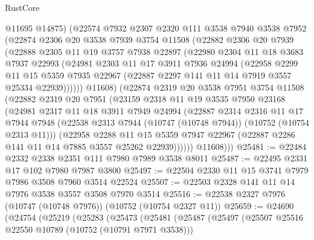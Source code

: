 \begin{lexlean}{RustCore}
\begin{coremodule}
        @11695
        @14875)
      (@22574
        @7932
        @2307
        @2320
        @111
        @3538
        @7940
        @3538
        @7952
        (@22874
          @2306
          @20
          @3538
          @7939
          @3754
          @11508
          (@22882
            @2306
            @20
            @7939
            (@22888
              @2305
              @11
              @19
              @3757
              @7938
              @22897
              (@22980
                @2304
                @11
                @18
                @3683
                @7937
                @22993
                (@24981
                  @2303
                  @11
                  @17
                  @3911
                  @7936
                  @24994
                  (@22958
                    @2299
                    @11
                    @15
                    @5359
                    @7935
                    @22967
                    (@22887 @2297 @141 @11 @14 @7919 @3557 @25334 @22939))))))
          @11608)
        (@22874
          @2319
          @20
          @3538
          @7951
          @3754
          @11508
          (@22882
            @2319
            @20
            @7951
            (@23159
              @2318
              @11
              @19
              @3535
              @7950
              @23168
              (@24981
                @2317
                @11
                @18
                @3911
                @7949
                @24994
                (@22887
                  @2314
                  @2316
                  @11
                  @17
                  @7944
                  @7948
                  (@22538 @2313 @7944 (@10747 (@10748 @7944)) (@10752 (@10754 @2313 @11)))
                  (@22958
                    @2288
                    @11
                    @15
                    @5359
                    @7947
                    @22967
                    (@22887 @2286 @141 @11 @14 @7885 @3557 @25262 @22939))))))
          @11608)))
@25481 := @22484 @2332 @2338 @2351 @111 @7980 @7989 @3538 @8011
@25487 := @22495 @2331 @17 @102 @7980 @7987 @3800
@25497 := @22504 @2330 @11 @15 @3741 @7979 @7986 @3508 @7960 @3514 @22524
@25507 := @22503 @2328 @141 @11 @14 @7976 @3538 @3557 @3508 @7970 @3514
@25516 := @22538 @2327 @7976 (@10747 (@10748 @7976)) (@10752 (@10754 @2327 @11))
@25659 := @24690
    (@24754
      (@25219
        (@25283
          (@25473
            (@25481
              (@25487
                (@25497
                  (@25507 @25516 @22550 @10789 (@10752 (@10791 @7971 @3538)))

\end{coremodule}
\end{lexlean}
